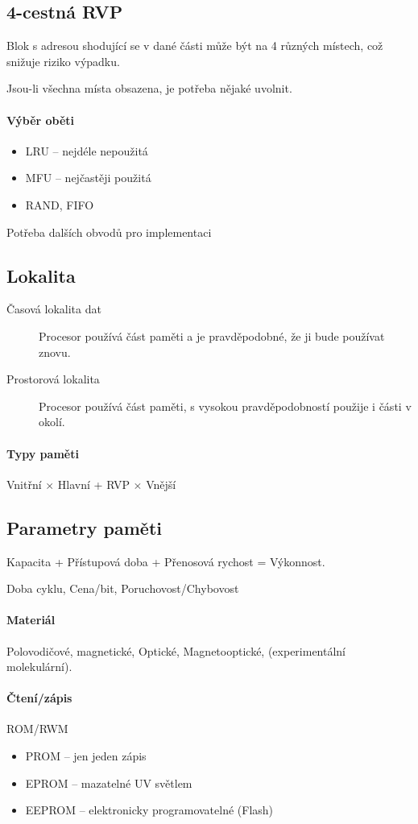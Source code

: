 \documentclass[a4paper, 11pt]{report}
\begin{document}
\subsection{4-cestná RVP}
Blok s adresou shodující se v dané části může být na 4 různých místech, což snižuje riziko výpadku.

Jsou-li všechna místa obsazena, je potřeba nějaké uvolnit.
\paragraph{Výběr oběti}
\begin{itemize}
	\item LRU -- nejdéle nepoužitá
	\item MFU -- nejčastěji použitá
	\item RAND, FIFO
\end{itemize}
Potřeba dalších obvodů pro implementaci

\subsection{Lokalita}
\begin{description}
	\item[Časová lokalita dat] Procesor používá část paměti a je pravděpodobné, že ji bude používat znovu.
	\item[Prostorová lokalita] Procesor používá část paměti, s vysokou pravděpodobností použije i části v okolí.
\end{description}

\paragraph{Typy paměti} Vnitřní $\times$ Hlavní + RVP $\times$ Vnější

\subsection{Parametry paměti}

Kapacita + Přístupová doba + Přenosová rychost = Výkonnost.

Doba cyklu, Cena/bit, Poruchovost/Chybovost

\paragraph{Materiál} Polovodičové, magnetické, Optické, Magnetooptické, (experimentální molekulární).

\paragraph{Čtení/zápis} ROM/RWM
\begin{itemize}
	\item PROM -- jen jeden zápis
	\item EPROM -- mazatelné UV světlem
	\item EEPROM -- elektronicky programovatelné (Flash)
\end{itemize}
\end{document}

